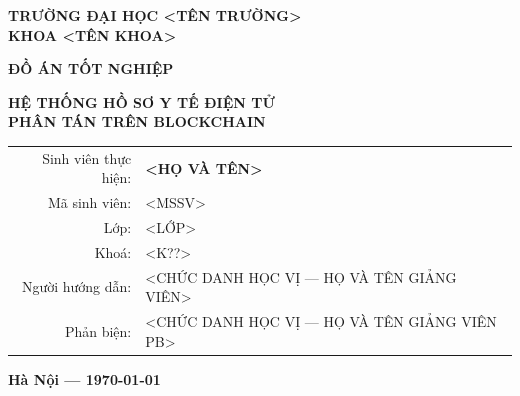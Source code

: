 \documentclass[../quyen]{subfiles}
\begin{document}
\begin{titlepage}
\begin{center}

\textbf{\large TRƯỜNG ĐẠI HỌC <TÊN TRƯỜNG>} \\
\textbf{\large KHOA <TÊN KHOA>} \\
\vspace{0.5cm}

\vspace{3cm}

\textbf{\Large ĐỒ ÁN TỐT NGHIỆP}\\
\vspace{0.5cm}

\textbf{\LARGE HỆ THỐNG HỒ SƠ Y TẾ ĐIỆN TỬ\\PHÂN TÁN TRÊN BLOCKCHAIN}

\vspace{2cm}

\begin{tabular}{rl}
Sinh viên thực hiện: & \textbf{<HỌ VÀ TÊN>} \\
Mã sinh viên: & <MSSV> \\
Lớp: & <LỚP> \\
Khoá: & <K??> \\
Người hướng dẫn: & <CHỨC DANH HỌC VỊ — HỌ VÀ TÊN GIẢNG VIÊN> \\
Phản biện: & <CHỨC DANH HỌC VỊ — HỌ VÀ TÊN GIẢNG VIÊN PB> \\
\end{tabular}

\vfill

\textbf{Hà Nội — \today}

\end{center}
\end{titlepage}
\end{document}
